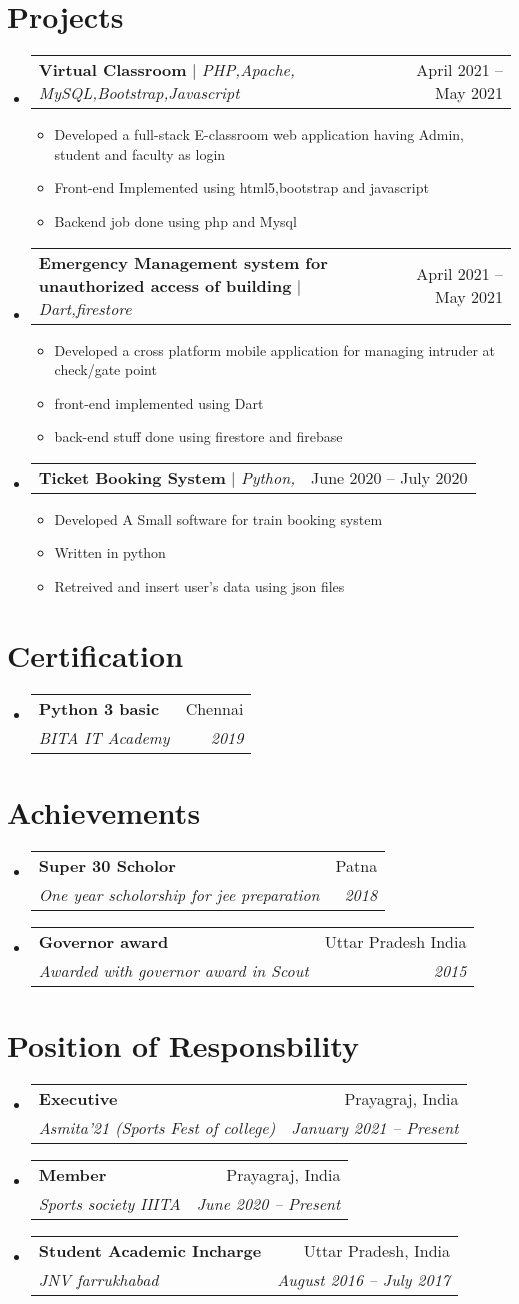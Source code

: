 \documentclass[letterpaper,11pt]{article}
\makeatletter
\newcommand{\resumeItem}[1]{
  \item\small{
    {#1 \vspace{-2pt}}
  }
}
\newcommand{\resumeSubheading}[4]{
  \vspace{-2pt}\item
    \begin{tabular*}{0.97\textwidth}[t]{l@{\extracolsep{\fill}}r}
      \textbf{#1} & #2 \\
      \textit{\small#3} & \textit{\small #4} \\
    \end{tabular*}\vspace{-7pt}
}
\newcommand{\resumeProjectHeading}[2]{
    \item
    \begin{tabular*}{0.97\textwidth}{l@{\extracolsep{\fill}}r}
      \small#1 & #2 \\
    \end{tabular*}\vspace{-7pt}
}
\newcommand{\resumeSubHeadingListStart}{\begin{itemize}[leftmargin=0.15in, label={}]}
\newcommand{\resumeSubHeadingListEnd}{\end{itemize}}
\newcommand{\resumeItemListStart}{\begin{itemize}}
\newcommand{\resumeItemListEnd}{\end{itemize}\vspace{-5pt}}
\makeatother
\begin{document}
\section{Projects}
    \resumeSubHeadingListStart
      \resumeProjectHeading
          {\textbf{Virtual Classroom} $|$ \emph{PHP,Apache, MySQL,Bootstrap,Javascript}}{April 2021 -- May 2021}
          \resumeItemListStart
            \resumeItem{Developed a full-stack E-classroom web application having Admin, student and faculty as login}
            \resumeItem{Front-end Implemented using html5,bootstrap and javascript}
            \resumeItem{Backend job done using php and Mysql}
          \resumeItemListEnd
      \resumeProjectHeading
          {\textbf{Emergency Management system for unauthorized access of building} $|$ \emph{Dart,firestore}}{April 2021 -- May 2021}
          \resumeItemListStart
            \resumeItem{Developed a cross platform mobile application for managing intruder at check/gate point}
            \resumeItem{front-end implemented using Dart}
            \resumeItem{back-end stuff done using firestore and firebase}
          \resumeItemListEnd
      \resumeProjectHeading
          {\textbf{Ticket Booking System} $|$ \emph{Python,}}{June 2020 -- July 2020}
          \resumeItemListStart
            \resumeItem{Developed A Small software for train booking system}
            \resumeItem{Written in python}
            \resumeItem{Retreived and insert user's data using json files }
          \resumeItemListEnd
    \resumeSubHeadingListEnd

\section{Certification}
\resumeItemListStart
\resumeSubheading
{Python 3 basic }{Chennai}
{BITA IT Academy}{2019}
\resumeItemListEnd
\section{Achievements}
  \resumeSubHeadingListStart
    \resumeSubheading
      {Super 30 Scholor}{Patna}
      {One year scholorship for jee preparation}{2018}
    \resumeSubheading
      {Governor award}{Uttar Pradesh India}
      {Awarded with governor award in Scout}{2015}
  \resumeSubHeadingListEnd
  

\section{Position of Responsbility}
  \resumeSubHeadingListStart
    \resumeSubheading
      {Executive}{Prayagraj, India}
      {Asmita'21 (Sports Fest of college)}{January 2021 -- Present}
    \resumeSubheading
      {Member }{Prayagraj, India}
      {Sports society IIITA}{June 2020 -- Present}
     \resumeSubheading
      {Student Academic Incharge}{Uttar Pradesh, India}
      {JNV farrukhabad}{August 2016 -- July 2017}
  \resumeSubHeadingListEnd


  


\end{document}
